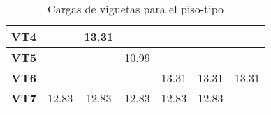 \begin{table}[H]
\begin{tabular}{|c|c|c|c|c|c|c|}
\hline
{\cellcolor[rgb]{0.741,0.89,0.741}}\textbf{VT4} & ~                                                & 13.31                                            & ~                                               & ~                                               & ~                                                 & ~                                                  \\ 
\hline
{\cellcolor[rgb]{0.741,0.89,0.741}}\textbf{VT5} & ~                                                & ~                                                & 10.99                                           & ~                                               & ~                                                 & ~                                                  \\ 
\hline
{\cellcolor[rgb]{0.741,0.89,0.741}}\textbf{VT6} & ~                                                & ~                                                & ~                                               & 13.31                                           & 13.31                                             & 13.31                                              \\ 
\hline
{\cellcolor[rgb]{0.741,0.89,0.741}}\textbf{VT7} & 12.83                                            & 12.83                                            & 12.83                                           & 12.83                                           & 12.83                                             & ~                                                  \\
\hline
\end{tabular}

     \caption{Cargas de viguetas para el piso-tipo }
  \label{tab:VTAPT}
\end{table}%


